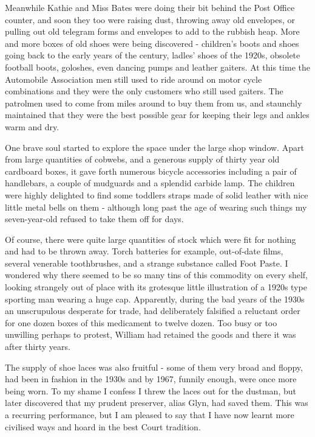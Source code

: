 Meanwhile Kathie and Miss Bates were doing their bit behind the Post Office counter, and soon they too were raising dust, throwing away old envelopes, or pulling out old telegram forms and envelopes to add to the rubbish heap. More and more boxes of old shoes were being discovered - children's boots and shoes going back to the early years of the century, ladles’ shoes of the 1920s, obsolete football boots, goloshes, even dancing pumps and leather gaiters. At this time the Automobile Association men still used to ride around on motor cycle combinations and they were the only customers who still used gaiters. The patrolmen used to come from miles around to buy them from us, and staunchly maintained that they were the best possible gear for keeping their legs and ankles warm and dry.

One brave soul started to explore the space under the large shop window. Apart from large quantities of cobwebs, and a generous supply of thirty year old cardboard boxes, it gave forth numerous bicycle accessories including a pair of handlebars, a couple of mudguards and a splendid carbide lamp. The children were highly delighted to find some toddlers straps made of solid leather with nice little metal bells on them - although long past the age of wearing such things my seven-year-old refused to take them off for days.

Of course, there were quite large quantities of stock which were fit for nothing and had to be thrown away. Torch batteries for example, out-of-date films, several venerable toothbrushes, and a strange substance called  Foot Paste. I wondered why there seemed to be so many tins of this commodity on every shelf, looking strangely out of place with its grotesque little illustration of a 1920s type sporting man wearing a huge cap. Apparently, during the bad years of the 1930s an unscrupulous  desperate for trade, had deliberately falsified a reluctant order for one dozen boxes of this medicament to twelve dozen. Too busy or too unwilling perhaps to protest, William had retained the goods and there it was after thirty years.

The supply of shoe laces was also fruitful - some of them very broad and floppy, had been in fashion in the 1930s and by 1967, funnily enough, were once more being worn. To my shame I confess I threw the laces out for the dustman, but later discovered that my prudent preserver, alias Glyn, had saved them. This was a recurring performance, but I am pleased to say that I have now learnt more civilised ways and hoard in the best Court tradition.

